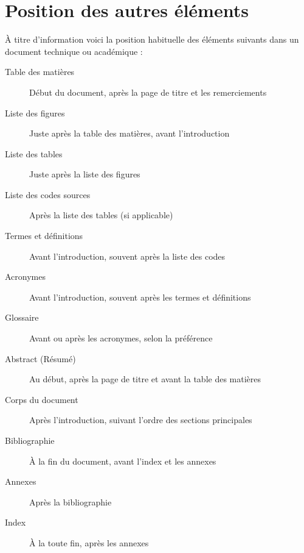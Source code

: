\newpage

\section{Position des autres éléments}

À titre d'information voici la position habituelle des éléments suivants dans un document technique ou académique :

\begin{description}
    \item[Table des matières] Début du document, après la page de titre et les remerciements
    \item[Liste des figures] Juste après la table des matières, avant l'introduction
    \item[Liste des tables] Juste après la liste des figures
    \item[Liste des codes sources] Après la liste des tables (si applicable)
    \item[Termes et définitions] Avant l'introduction, souvent après la liste des codes
    \item[Acronymes] Avant l'introduction, souvent après les termes et définitions
    \item[Glossaire] Avant ou après les acronymes, selon la préférence
    \item[Abstract (Résumé)] Au début, après la page de titre et avant la table des matières
    \item[Corps du document] Après l'introduction, suivant l'ordre des sections principales
    \item[Bibliographie] À la fin du document, avant l'index et les annexes
    \item[Annexes] Après la bibliographie
    \item[Index] À la toute fin, après les annexes
\end{description}